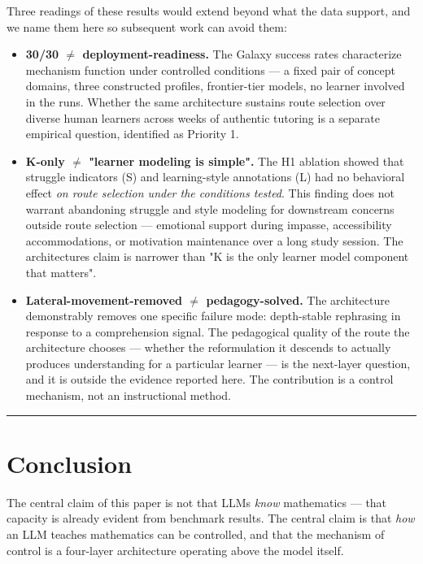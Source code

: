 \documentclass[
]{article}
\providecommand{\tightlist}{%
  \setlength{\itemsep}{0pt}\setlength{\parskip}{0pt}}
\begin{document}
Three readings of these results would extend beyond what the data support, and we name them here so subsequent work can avoid them:

\begin{itemize}
\tightlist
\item
  \textbf{30/30 $\neq$ deployment-readiness.} The Galaxy success rates characterize mechanism function under controlled conditions --- a fixed pair of concept domains, three constructed profiles, frontier-tier models, no learner involved in the runs. Whether the same architecture sustains route selection over diverse human learners across weeks of authentic tutoring is a separate empirical question, identified as Priority 1.
\item
  \textbf{K-only $\neq$ "learner modeling is simple".} The H1 ablation showed that struggle indicators (S) and learning-style annotations (L) had no behavioral effect \emph{on route selection under the conditions tested}. This finding does not warrant abandoning struggle and style modeling for downstream concerns outside route selection --- emotional support during impasse, accessibility accommodations, or motivation maintenance over a long study session. The architecture\textquotesingle s claim is narrower than "K is the only learner model component that matters".
\item
  \textbf{Lateral-movement-removed $\neq$ pedagogy-solved.} The architecture demonstrably removes one specific failure mode: depth-stable rephrasing in response to a comprehension signal. The pedagogical quality of the route the architecture chooses --- whether the reformulation it descends to actually produces understanding for a particular learner --- is the next-layer question, and it is outside the evidence reported here. The contribution is a control mechanism, not an instructional method.
\end{itemize}

\begin{center}\rule{0.5\linewidth}{0.5pt}\end{center}

\section{Conclusion}\label{conclusion}

The central claim of this paper is not that LLMs \emph{know} mathematics --- that capacity is already evident from benchmark results. The central claim is that \emph{how} an LLM teaches mathematics can be controlled, and that the mechanism of control is a four-layer architecture operating above the model itself.
\end{document}
